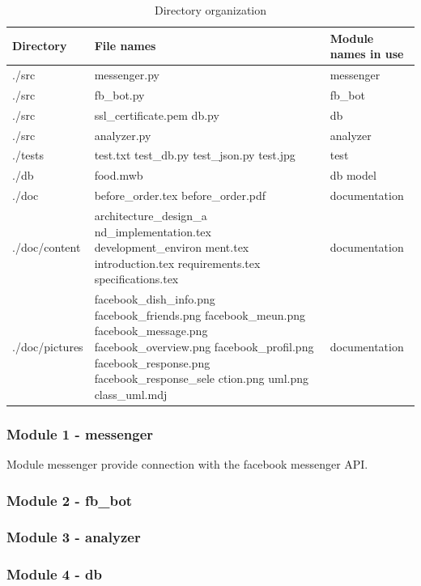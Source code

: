 \begin{table}[htbp]
\caption{Directory organization}
\begin{tabularx}{\linewidth}{|X|X|X|}
\toprule
Directory & File names & Module names in use  \\
\midrule
./src & messenger.py & messenger  \newline\\
./src & fb\_bot.py &  fb\_bot\newline \\
./src & ssl\_certificate.pem db.py \newline  & db \\
./src & analyzer.py & analyzer \newline \\
./tests & 
test.txt \newline 
test\_db.py \newline
test\_json.py	 \newline
test.jpg  \newline
& test\\
./db & food.mwb \newline & db model  \\
./doc & before\_order.tex before\_order.pdf \newline & documentation  \\
./doc/content & architecture\_design\_a nd\_implementation.tex development\_environ ment.tex introduction.tex requirements.tex specifications.tex \newline & documentation \\
./doc/pictures & 
facebook\_dish\_info.png \newline
facebook\_friends.png \newline
facebook\_meun.png \newline
facebook\_message.png \newline
facebook\_overview.png \newline
facebook\_profil.png \newline
facebook\_response.png \newline
facebook\_response\_sele ction.png	\newline
uml.png \newline
class\_uml.mdj 
& documentation \\
\end{tabularx}
\end{table}
\FloatBarrier

\subsubsection{Module 1 - messenger}
Module messenger provide connection with the facebook messenger API. 

\subsubsection{Module 2 - fb\_bot}

\subsubsection{Module 3 - analyzer}

\subsubsection{Module 4 - db}

